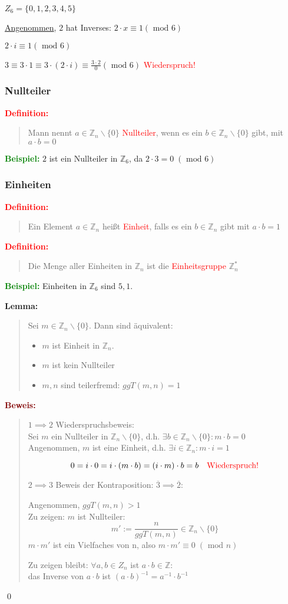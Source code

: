 \documentclass{article}
\newcommand{\red}[1]{\textcolor{red}{#1}}
\newcommand{\green}[1]{\textcolor{green}{#1}}
\newcommand{\dgr}[1]{\textcolor{dgr}{#1}}
\newcommand{\maroon}[1]{\textcolor{maroon}{#1}}
\newcommand{\ex}{\green{\textbf{Beispiel: }}}
\newcommand{\de}[1]{\red{\textbf{Definition: }}\begin{quote}#1\end{quote}}
\newcommand{\lem}[1]{\dgr{\textbf{Lemma: }}\begin{quote}#1\end{quote}}
\newcommand{\pr}[1]{\maroon{\textbf{Beweis: }}\begin{quote}#1\end{quote}\qed}
\newcommand{\n}[1]{\overline{#1}}
\newcommand{\Z}{\mathbb{Z}}
\renewcommand{\mod}{\text{ mod }}
\newcommand{\bs}{\backslash}
\begin{document}
$Z_6 = \{0,1,2,3,4,5\}$

\underline{Angenommen}, $2$ hat Inverses: $2 \cdot x \equiv 1 (\mod 6)$

$2 \cdot i \equiv 1 (\mod 6)$

$3 \equiv 3 \cdot 1 \equiv 3 \cdot (2 \cdot i) \equiv \frac{3 \cdot 2}{0} (\mod 6)$ \red{Wiederspruch!}

\subsubsection{Nullteiler}
\de{
    Mann nennt $a \in \Z_n \bs \{0\}$ \red{Nullteiler}, wenn es ein $b \in \Z_n \bs \{0\}$ gibt, mit $a \cdot b = 0$
}
\ex $2$ ist ein Nullteiler in $\Z_6$, da $2 \cdot 3 = 0 \; (\mod 6)$

\subsubsection{Einheiten}
\de{Ein Element $a \in \Z_n$ heißt \red{Einheit}, falls es ein $b \in \Z_n$ gibt mit $a \cdot b = 1$}

\de{
    Die Menge aller Einheiten in $\Z_n$ ist die \red{Einheitsgruppe} $\Z_n^*$
}

\ex Einheiten in $\Z_6$ sind $5, 1$.

\lem{
    Sei $m \in \Z_n \bs \{0\}$.
    Dann sind äquivalent:
    \begin{itemize}
        \item $m$ ist Einheit in $\Z_n$.
        \item $m$ ist kein Nullteiler
        \item $m,n$ sind teilerfremd: $ggT(m,n) = 1$
    \end{itemize}
}
\pr{
    $1 \implies 2$ Wiederspruchsbeweis:\\
    Sei $m$ ein Nullteiler in $\Z_n \bs \{0\}$, d.h. $\exists b \in \Z_n \bs \{0\}: m \cdot b = 0$\\
    Angenommen, $m$ ist eine Einheit, d.h. $\exists i \in \Z_n: m \cdot i = 1$

    \[
        0 = i \cdot 0 = i \cdot (m \cdot b) = (i \cdot m) \cdot b = b \text{\red{\quad Wiederspruch!}}
    \]

    $2 \implies 3$ Beweis der Kontraposition: $\n{3} \implies \n{2}$:

    Angenommen, $ggT(m,n) > 1$\\
    Zu zeigen: $m$ ist Nullteiler:
    \[
        m' := \frac{n}{ggT(m,n)} \in \Z_n \bs \{0\}
    \]
    $m \cdot m'$ ist ein Vielfaches von n, also $m \cdot m' \equiv 0 \; (\mod n)$

    Zu zeigen bleibt: $\forall a,b \in Z_n$ ist $a \cdot b \in \Z$:\\
    das Inverse von $a \cdot b$ ist $(a \cdot b)^{-1} = a^{-1} \cdot b^{-1}$
}
\end{document}
